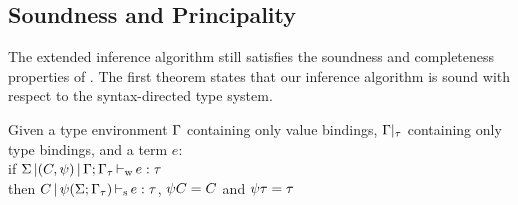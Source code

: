 



\subsection{Soundness and Principality}

The extended inference algorithm still satisfies the soundness
and completeness properties of \hmx.
%
The first theorem states that our inference algorithm is sound
with respect to the syntax-directed type system.

\begin{theorem}
  Given a type environment $\Gamma$ containing only value bindings,
  $\Gamma|_\tau$ containing only type bindings, and a term $e$:\\
  if $\Sigma \operatorname{|} (C,\mathrm{\psi}) \operatorname{|} \Gamma;\Gamma_\tau \operatorname{\vdash_w} e : \tau$\\
  then $C \operatorname{|} \mathrm{\psi}(\Sigma;\Gamma_\tau) \operatorname{\vdash_s} e : \tau$, $\mathrm{\psi} C = C$ and $\mathrm{\psi} \tau = \tau$
\end{theorem}

